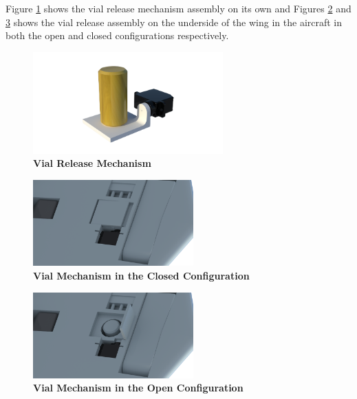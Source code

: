     Figure \ref{fig:vial_assembly} shows the vial release mechanism assembly on its own and Figures \ref{fig:vial_closed} and \ref{fig:vial_open} shows the vial release assembly on the underside of the wing in the aircraft in both the open and closed configurations respectively.
    
    \begin{figure}[H]
        \centering
        \includegraphics[width=0.65\textwidth]{homeworks/homework4/report/Figure/assembly_vial_door.png}
        \caption{\textbf{Vial Release Mechanism}}
        \label{fig:vial_assembly}
    \end{figure}
            
    \begin{figure}[H]
        \centering
        \includegraphics[width=0.55\textwidth]{homeworks/homework4/report/Figure/aircraft_assembly_door_closed.png}
        \caption{\textbf{Vial Mechanism in the Closed Configuration}}
        \label{fig:vial_closed}
    \end{figure}
    
    \begin{figure}[H]
        \centering
        \includegraphics[width=0.55\textwidth]{homeworks/homework4/report/Figure/aircraft_assembly_door_open.png}
        \caption{\textbf{Vial Mechanism in the Open Configuration}}
        \label{fig:vial_open}
    \end{figure}
    
